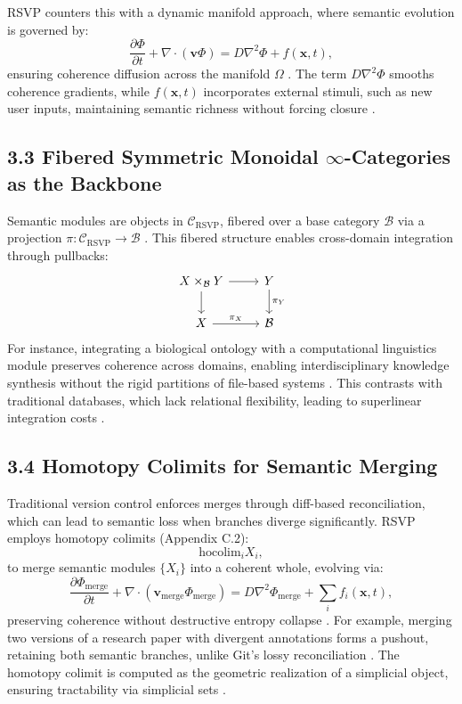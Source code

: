 \documentclass[12pt]{article}
\begin{document}
RSVP counters this with a dynamic manifold approach, where semantic evolution is governed by:
\[
\frac{\partial \Phi}{\partial t} + \nabla \cdot (\mathbf{v} \Phi) = D \nabla^2 \Phi + f(\mathbf{x}, t),
\]
ensuring coherence diffusion across the manifold \(\Omega\) \citep{gromov1999}. The term \(D \nabla^2 \Phi\) smooths coherence gradients, while \(f(\mathbf{x}, t)\) incorporates external stimuli, such as new user inputs, maintaining semantic richness without forcing closure \citep{jaynes2003}.

\subsection*{3.3 Fibered Symmetric Monoidal \(\infty\)-Categories as the Backbone}

Semantic modules are objects in \(\mathcal{C}_{\text{RSVP}}\), fibered over a base category \(\mathcal{B}\) via a projection \(\pi: \mathcal{C}_{\text{RSVP}} \to \mathcal{B}\) \citep{lawvere2009}. This fibered structure enables cross-domain integration through pullbacks:
\[
\begin{tikzcd}
X \times_{\mathcal{B}} Y \arrow[r] \arrow[d] & Y \arrow[d, "\pi_Y"] \\
X \arrow[r, "\pi_X"] & \mathcal{B}
\end{tikzcd}
\]
For instance, integrating a biological ontology with a computational linguistics module preserves coherence across domains, enabling interdisciplinary knowledge synthesis without the rigid partitions of file-based systems \citep{maclane1998}. This contrasts with traditional databases, which lack relational flexibility, leading to superlinear integration costs \citep{bird1988}.

\subsection*{3.4 Homotopy Colimits for Semantic Merging}

Traditional version control enforces merges through diff-based reconciliation, which can lead to semantic loss when branches diverge significantly. RSVP employs homotopy colimits (Appendix C.2):
\[
\text{hocolim}_i X_i,
\]
to merge semantic modules \(\{X_i\}\) into a coherent whole, evolving via:
\[
\frac{\partial \Phi_{\text{merge}}}{\partial t} + \nabla \cdot (\mathbf{v}_{\text{merge}} \Phi_{\text{merge}}) = D \nabla^2 \Phi_{\text{merge}} + \sum_i f_i(\mathbf{x}, t),
\]
preserving coherence without destructive entropy collapse \citep{hatcher2002}. For example, merging two versions of a research paper with divergent annotations forms a pushout, retaining both semantic branches, unlike Git’s lossy reconciliation \citep{milewski2018}. The homotopy colimit is computed as the geometric realization of a simplicial object, ensuring tractability via simplicial sets \citep{may1999}.
\end{document}
